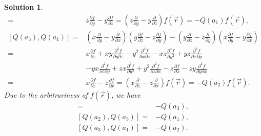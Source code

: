 \documentclass[UTF8,10pt,a4paper]{article}
\theoremstyle{Problem}
\theoremstyle{Solution}
\newtheorem*{sol}{Solution}
\begin{document}
\begin{sol}
\begin{align}
        =&z\frac{\partial f}{\partial y}-y\frac{\partial f}{\partial z}=\left(z\frac{\partial}{\partial y}-y\frac{\partial}{\partial z}\right)f(\vec{r})=-Q(a_1)f(\vec{r}),\\
        \nonumber[Q(a_3),Q(a_1)]=&\left(x\frac{\partial}{\partial y}-y\frac{\partial}{\partial x}\right)\left(y\frac{\partial f}{\partial z}-z\frac{\partial f}{\partial y}\right)-\left(y\frac{\partial}{\partial z}-z\frac{\partial}{\partial y}\right)\left(x\frac{\partial f}{\partial y}-y\frac{\partial f}{\partial x}\right)\\
        \nonumber=&x\frac{\partial f}{\partial z}+xy\frac{\partial^2f}{\partial y\partial z}-y^2\frac{\partial^2f}{\partial x\partial z}-xz\frac{\partial^2f}{\partial y^2}+yz\frac{\partial^2f}{\partial x\partial y}\\
        \nonumber&-yx\frac{\partial^2f}{\partial z\partial y}+zx\frac{\partial^2f}{\partial y^2}+y^2\frac{\partial^2f}{\partial z\partial x}-z\frac{\partial f}{\partial x}-zy\frac{\partial^2f}{\partial y\partial x}\\
        =&x\frac{\partial f}{\partial z}-z\frac{\partial f}{\partial x}=\left(x\frac{\partial}{\partial z}-z\frac{\partial}{\partial x}\right)f(\vec{r})=-Q(a_2)f(\vec{r}).
    \end{align}
    Due to the arbitrariness of $f(\vec{r})$, we have
    \begin{align}
        [Q(a_1),Q(a_2)]=&-Q(a_3),\\
        [Q(a_2),Q(a_3)]=&-Q(a_1),\\
        [Q(a_3),Q(a_1)]=&-Q(a_2).
    \end{align}
\end{sol}
\end{document}
